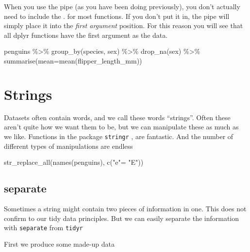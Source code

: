 \documentclass[
]{book}
\newenvironment{Shaded}{\begin{snugshade}}{\end{snugshade}}
\newcommand{\AttributeTok}[1]{\textcolor[rgb]{0.77,0.63,0.00}{#1}}
\newcommand{\FunctionTok}[1]{\textcolor[rgb]{0.00,0.00,0.00}{#1}}
\newcommand{\NormalTok}[1]{#1}
\newcommand{\OtherTok}[1]{\textcolor[rgb]{0.56,0.35,0.01}{#1}}
\newcommand{\SpecialCharTok}[1]{\textcolor[rgb]{0.00,0.00,0.00}{#1}}
\newcommand{\StringTok}[1]{\textcolor[rgb]{0.31,0.60,0.02}{#1}}
\begin{document}
When you use the pipe (as you have been doing previously), you don't actually need to include the . for most functions. If you don't put it in, the pipe will simply place it into the \emph{first argument} position. For this reason you will see that all dplyr functions have the first argument as the data.

\begin{Shaded}
\begin{Highlighting}[]
\NormalTok{penguins }\SpecialCharTok{\%\textgreater{}\%} 
  \FunctionTok{group\_by}\NormalTok{(species, sex) }\SpecialCharTok{\%\textgreater{}\%} 
  \FunctionTok{drop\_na}\NormalTok{(sex) }\SpecialCharTok{\%\textgreater{}\%} 
  \FunctionTok{summarise}\NormalTok{(}\AttributeTok{mean=}\FunctionTok{mean}\NormalTok{(flipper\_length\_mm))}
\end{Highlighting}
\end{Shaded}

\hypertarget{strings}{%
\section{Strings}\label{strings}}

Datasets often contain words, and we call these words ``strings''. Often these aren't quite how we want them to be, but we can manipulate these as much as we like. Functions in the package \texttt{stringr} \citet{R-stringr}, are fantastic. And the number of different types of manipulations are endless

\begin{Shaded}
\begin{Highlighting}[]
\FunctionTok{str\_replace\_all}\NormalTok{(}\FunctionTok{names}\NormalTok{(penguins), }\FunctionTok{c}\NormalTok{(}\StringTok{"e"}\OtherTok{=} \StringTok{"E"}\NormalTok{))}
\end{Highlighting}
\end{Shaded}

\hypertarget{separate}{%
\subsection{separate}\label{separate}}

Sometimes a string might contain two pieces of information in one. This does not confirm to our tidy data principles. But we can easily separate the information with \texttt{separate} from \texttt{tidyr} \citet{R-tidyr}

First we produce some made-up data
\end{document}
